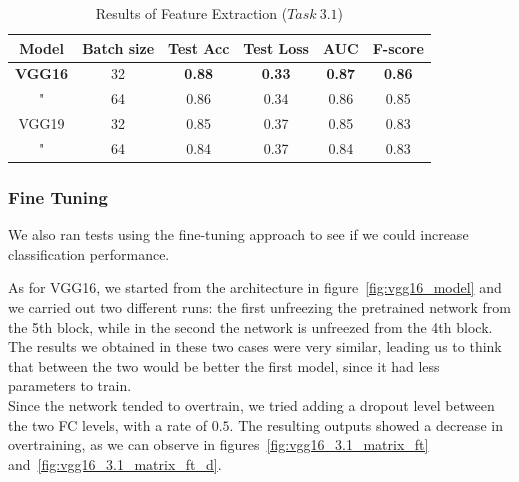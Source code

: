 \documentclass[11pt,a4paper,oneside]{article}
\begin{document}
\begin{table}[h]
\centering
\begin{tabular}{|cc|cccc|}
\hline
Model & Batch size & Test Acc & Test Loss & AUC & F-score \\
\hline
\textbf{VGG16} & 32 & \textbf{0.88} & \textbf{0.33} & \textbf{0.87} & \textbf{0.86} \\
" 	  & 64 & 0.86 & 0.34 & 0.86 & 0.85 \\
VGG19 & 32 & 0.85 & 0.37 & 0.85 & 0.83  \\
" 	  & 64 & 0.84 & 0.37 & 0.84 & 0.83 \\
\hline
\end{tabular}
\caption{Results of Feature Extraction ($Task\ 3.1$)}
\label{tab:task3.1_fe}
\end{table}


\clearpage

\subsubsection{Fine Tuning}
We also ran tests using the fine-tuning approach to see if we could increase classification performance.

As for VGG16, we started from the architecture in figure~\ref{fig:vgg16_model} and we carried out two different runs: the first unfreezing the pretrained network from the 5th block, while in the second the network is unfreezed from the 4th block. The results we obtained in these two cases were very similar, leading us to think that between the two would be better the first model, since it had less parameters to train. \\
Since the network tended to overtrain, we tried adding a dropout level between the two FC levels, with a rate of $0.5$. The resulting outputs showed a decrease in overtraining, as we can observe in figures~\ref{fig:vgg16_3.1_matrix_ft} and~\ref{fig:vgg16_3.1_matrix_ft_d}. 
\end{document}
